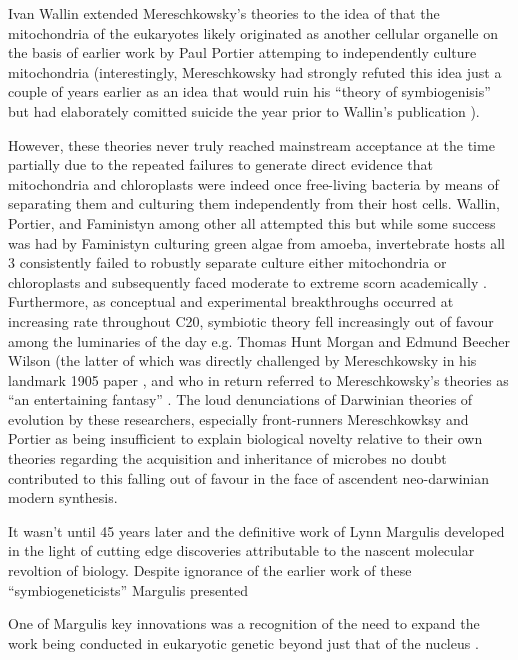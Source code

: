 Ivan Wallin extended Mereschkowsky's theories to the idea of that the mitochondria
of the eukaryotes likely originated as another cellular organelle \citep{Wallin1922} 
on the basis of earlier work by Paul Portier attemping to independently
culture mitochondria \citep{Sapp2002} (interestingly, 
Mereschkowsky had strongly refuted this idea just a couple of years earlier as 
an idea that would ruin his ``theory of symbiogenisis'' \citep{Sapp2002} but 
had elaborately comitted suicide the year prior to Wallin's publication \citep{Sapp200}).

However, these theories never truly reached mainstream acceptance at the time
partially due to the repeated failures to generate direct evidence that mitochondria
and chloroplasts were indeed once free-living bacteria by means of separating them
and culturing them independently from their host cells.  Wallin, Portier, and Faministyn
among other all attempted this but while some success was had by Faministyn
culturing green algae from amoeba, invertebrate hosts all 3 consistently failed
to robustly separate culture either mitochondria or chloroplasts and subsequently
faced moderate to extreme scorn academically \citep{Archibald2014}.
Furthermore, as conceptual and experimental breakthroughs occurred at increasing
rate throughout C20, symbiotic theory fell increasingly out of favour among
the luminaries of the day e.g. Thomas Hunt Morgan and Edmund Beecher Wilson (the
latter of which was directly challenged by Mereschkowsky in his landmark 1905
paper \citep{Mereschkowsky1905,Martin1999a}, and who in return referred to Mereschkowsky's
theories as ``an entertaining fantasy'' \citep{Wilson1928,Martin1999a}
\citep{Archibald2014}. The loud denunciations of Darwinian theories of evolution
by these researchers, especially front-runners Mereschkowksy and Portier as being
insufficient to explain biological novelty relative to their own theories
regarding the acquisition and inheritance of microbes \citep{Sapp2002} no doubt
contributed to this falling out of favour in the face of ascendent neo-darwinian
modern synthesis.


It wasn't until 45 years later and the definitive work of Lynn Margulis \citep{Sagan1967} 
developed in the light of cutting edge discoveries attributable to the nascent
molecular revoltion of biology. Despite ignorance of the earlier work of these 
``symbiogeneticists'' \citep{Archibald2014} Margulis presented 


One of Margulis key innovations was a recognition of the need to expand the
work being conducted in eukaryotic genetic beyond just that of the nucleus
\citep{Archibald2002}.





